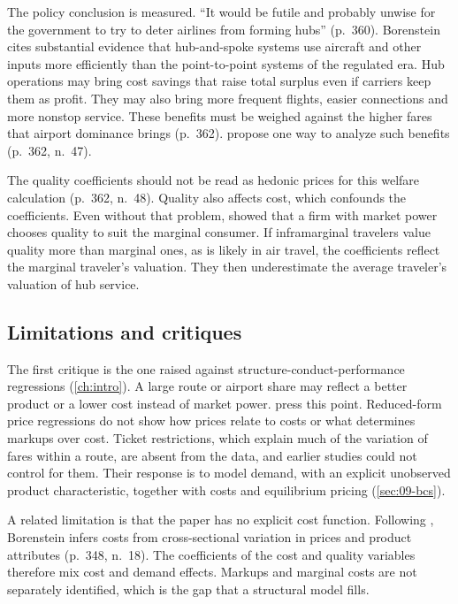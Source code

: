 The policy conclusion is measured. ``It would be futile and probably unwise for the government to try to deter
airlines from forming hubs'' (p.~360). Borenstein cites substantial evidence that hub-and-spoke systems use
aircraft and other inputs more efficiently than the point-to-point systems of the regulated era. Hub operations
may bring cost savings that raise total surplus even if carriers keep them as profit. They may also bring more
frequent flights, easier connections and more nonstop service. These benefits must be weighed against the higher
fares that airport dominance brings (p.~362). \citet{CarltonLandesPosner1980} propose one way to analyze such
benefits (p.~362, n.~47).

The quality coefficients should not be read as hedonic prices for this welfare calculation (p.~362, n.~48).
Quality also affects cost, which confounds the coefficients. Even without that problem, \citet{Spence1975}
showed that a firm with market power chooses quality to suit the marginal consumer. If inframarginal travelers
value quality more than marginal ones, as is likely in air travel, the coefficients reflect the marginal
traveler's valuation. They then underestimate the average traveler's valuation of hub service.

\subsection{Limitations and critiques}\label{sec:09-bor-critiques}

The first critique is the one \citet{Demsetz1973} raised against structure-conduct-performance regressions
(\cref{ch:intro}). A large route or airport share may reflect a better product or a lower cost instead of
market power. \citet[pp.~5--6]{BerryCarnallSpiller2006} press this point. Reduced-form price regressions do not
show how prices relate to costs or what determines markups over cost. Ticket restrictions, which explain much
of the variation of fares within a route, are absent from the data, and earlier studies could not control for
them. Their response is to model demand, with an explicit unobserved product characteristic, together with
costs and equilibrium pricing (\cref{sec:09-bcs}).

A related limitation is that the paper has no explicit cost function. Following \citet{Bresnahan1989},
Borenstein infers costs from cross-sectional variation in prices and product attributes (p.~348, n.~18). The
coefficients of the cost and quality variables therefore mix cost and demand effects. Markups and marginal costs
are not separately identified, which is the gap that a structural model fills.

